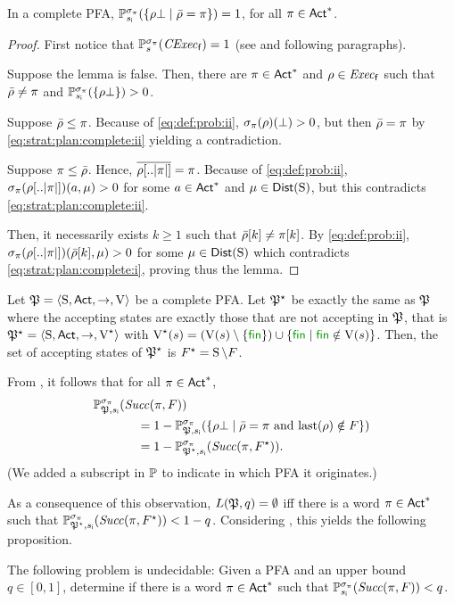 \begin{lemma}\label{lm:strat:plan:complete}
  In a complete PFA,
  $\Prob_{\sini}^{\strat_\plan}(\{{\rho\complete}\mid{\bar{\rho}=\plan}\})=1$,
  for all $\plan\in\Act^*$.
\end{lemma}
%
\begin{proof}
  First notice that $\Prob^{\strat_\plan}_s(\cexecf)=1$ (see
   and following paragraphs).
  
  Suppose the lemma is false.  Then, there are $\plan\in\Act^*$ and
  $\rho\in\execf$ such that $\bar{\rho}\neq\plan$ and
  $\Prob_{\sini}^{\strat_\plan}(\{\rho\complete\})>0$.

  Suppose $\bar{\rho}\leq\plan$. Because of \cref{eq:def:prob:ii},
  $\strat_\plan(\rho)(\complete)> 0$, but then $\bar{\rho}=\plan$
  by \cref{eq:strat:plan:complete:ii} yielding a contradiction.

  Suppose $\plan\leq\bar{\rho}$. Hence,
  $\overline{\rho[..\size{\plan}]}=\plan$.  Because of
  \cref{eq:def:prob:ii}, $\strat_\plan(\rho[..\size{\plan}])(a,\mu)>0$
  for some $a\in\Act^*$ and $\mu\in\Dist(\S)$, but this contradicts
  \cref{eq:strat:plan:complete:ii}.

  Then, it necessarily exists $k\geq1$ such that
  $\bar{\rho}[k]\neq\plan[k]$.  By \cref{eq:def:prob:ii},
  $\strat_\plan(\rho[..\size{\plan}])(\bar{\rho}[k],\mu)>0$ for some
  $\mu\in\Dist(\S)$ which contradicts \cref{eq:strat:plan:complete:i},
  proving thus the lemma.
\end{proof}

Let $\pfa=\tup{\S,\Act,\ra,\V}$ be a complete PFA.  Let $\pfa^\star$
be exactly the same as $\pfa$ where the accepting states are exactly
those that are not accepting in $\pfa$, that is
$\pfa^\star=\tup{\S,\Act,\ra,\V^\star}$ with
$\V^\star(s)=(\V(s)\setminus\{\fin\})\cup\{\fin\mid{\fin\notin\V(s)}\}$.
%
Then, the set of accepting states of $\pfa^\star$ is
$F^\star=\S\setminus F$.

From , it follows that for all $\plan\in\Act^*$,
%
\begin{align*}
  \Prob_{\pfa,\sini}^{\strat_\plan}(\Succ(\plan,F)) \hspace{-4em} & \\
  &  =
  1 - \Prob_{\pfa,\sini}^{\strat_\plan}(\{{\rho\complete}\mid{\bar{\rho}=\plan \text{ and } \last(\rho)\notin F}\}) \\
  & =
  1 - \Prob_{\pfa^\star,\sini}^{\strat_\plan}(\Succ(\plan,F^\star)).
\end{align*}
%
(We added a subscript in $\Prob$ to indicate in which PFA it
originates.)

As a consequence of this observation, $L(\pfa,q)=\emptyset$ iff there
is a word $\plan\in\Act^*$ such that
$\Prob_{\pfa^\star,\sini}^{\strat_\plan}(\Succ(\plan,F^\star)) < 1-q$.
%
Considering , this yields the
following proposition.

\begin{proposition}
  The following problem is undecidable:
  Given a PFA and an upper bound $q\in[0,1]$, determine if there is a
  word $\plan\in\Act^*$ such that
  $\Prob_{\sini}^{\strat_\plan}(\Succ(\plan,F)) < q$.
\end{proposition}
